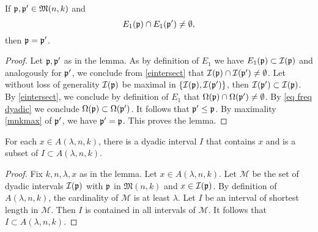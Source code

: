 \begin{lemma}\label{pairwise disjoint}
        If $\mathfrak p, \mathfrak p' \in {\mathfrak{M}}(n,k)$ and
        \begin{equation}\label{eintersect}
        {E_1}(\mathfrak p)\cap {E_1}(\mathfrak p')\neq \emptyset,
        \end{equation}
        then $\mathfrak p=\mathfrak p'$.
\end{lemma}
\begin{proof}
Let $\mathfrak p,\mathfrak p'$ as in the lemma. As by definition of $E_1$
we have
$E_1(\mathfrak p)\subset \mathcal{I}(\mathfrak p)$ and analogously for $\mathfrak p'$, we conclude from \eqref{eintersect} that  $\mathcal{I}(\mathfrak p)\cap \mathcal{I}(\mathfrak p')\neq \emptyset$. Let without loss of generality $\mathcal{I}(\mathfrak p)$ be maximal in
$\{\mathcal{I}(\mathfrak p),\mathcal{I}(\mathfrak p')\}$, then $\mathcal{I}(\mathfrak p')\subset \mathcal{I}(\mathfrak p)$.
By \eqref{eintersect}, we conclude by definition of $E_1$ that $\Omega(\mathfrak p)\cap \Omega(\mathfrak p')\neq \emptyset$. By
\eqref{eq freq dyadic} we conclude $\Omega(\mathfrak p)\subset \Omega(\mathfrak p')$. It follows that $\mathfrak p'\le \mathfrak p$. By maximality
\eqref{mnkmax}
of $\mathfrak p'$, we have $\mathfrak p'=\mathfrak p$. This proves the lemma.
\end{proof}


\begin{lemma}\label{adyadic}
For each  $x\in A(\lambda,n,k)$,
there is a dyadic interval $I$
that contains $x$ and is
a subset of
$I\subset A(\lambda,n,k)$.
\end{lemma}

\begin{proof}

Fix $k,n,\lambda,x$ as in the lemma.
Let  $x\in A(\lambda,n,k)$. Let
$\mathcal{M}$ be the set of dyadic intervals
    $\mathcal{I}(\mathfrak p)$
with $\mathfrak p$ in  $\mathfrak{M}(n,k)$
and $x\in \mathcal{I}(\mathfrak p)$. By definition of
$A(\lambda,n,k)$, the cardinality of $\mathcal{M}$
is at least $\lambda$. Let $I$ be an interval of
shortest length in $\mathcal{M}$. Then
$I$ is contained in all intervals of $\mathcal{M}$.
It follows that $I\subset A(\lambda,n,k)$.
\end{proof}

